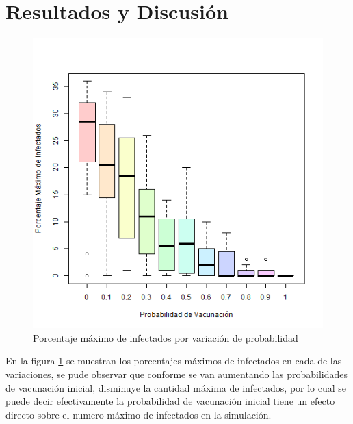 \documentclass{article}
\begin{document}
\section{Resultados y Discusi\'{o}n}\label{res}


\begin{figure}[H]
       \begin{center}
           \includegraphics[width=13cm]{pr6sim.png}
       \end{center}
\caption{Porcentaje m\'aximo de infectados por variaci\'on de probabilidad}
        \label{f1}
\end{figure}
 
En la figura \ref{f1} se muestran los porcentajes m\'aximos de infectados en cada de las variaciones, se pude observar que conforme se van aumentando las probabilidades de vacunaci\'on inicial, disminuye la cantidad m\'axima de infectados, por lo cual se puede decir efectivamente la probabilidad de vacunaci\'on inicial tiene un efecto directo sobre el numero m\'aximo de infectados en la simulaci\'on.
\end{document}
